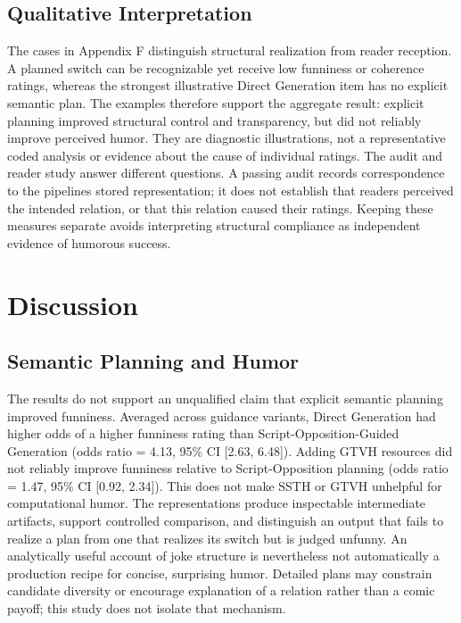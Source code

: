\documentclass[11pt]{article}
\begin{document}
\subsection{Qualitative Interpretation}\label{qualitative-interpretation}

The cases in Appendix F distinguish structural realization from reader reception. A planned switch can be recognizable yet receive low funniness or coherence ratings, whereas the strongest illustrative Direct Generation item has no explicit semantic plan. The examples therefore support the aggregate result: explicit planning improved structural control and transparency, but did not reliably improve perceived humor. They are diagnostic illustrations, not a representative coded analysis or evidence about the cause of individual ratings. The audit and reader study answer different questions. A passing audit records correspondence to the pipeline\textquotesingle s stored representation; it does not establish that readers perceived the intended relation, or that this relation caused their ratings. Keeping these measures separate avoids interpreting structural compliance as independent evidence of humorous success.

\section{Discussion}\label{discussion}

\subsection{Semantic Planning and Humor}\label{semantic-planning-and-humor}

The results do not support an unqualified claim that explicit semantic planning improved funniness. Averaged across guidance variants, Direct Generation had higher odds of a higher funniness rating than Script-Opposition-Guided Generation (odds ratio = 4.13, 95\% CI {[}2.63, 6.48{]}). Adding GTVH resources did not reliably improve funniness relative to Script-Opposition planning (odds ratio = 1.47, 95\% CI {[}0.92, 2.34{]}). This does not make SSTH or GTVH unhelpful for computational humor. The representations produce inspectable intermediate artifacts, support controlled comparison, and distinguish an output that fails to realize a plan from one that realizes its switch but is judged unfunny. An analytically useful account of joke structure is nevertheless not automatically a production recipe for concise, surprising humor. Detailed plans may constrain candidate diversity or encourage explanation of a relation rather than a comic payoff; this study does not isolate that mechanism.
\end{document}
